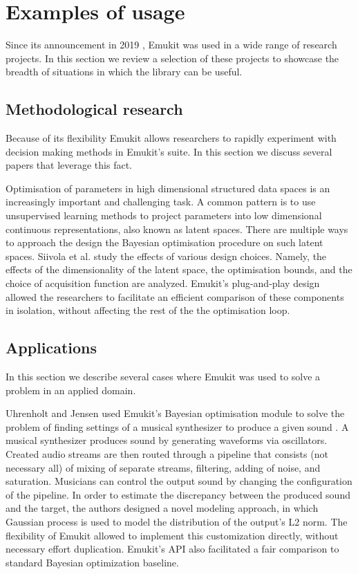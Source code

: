 
\section{Examples of usage}
Since its announcement in 2019 \cite{paleyes2019emulation}, Emukit was used in a wide range of research projects. In this section we review a selection of these projects to showcase the breadth of situations in which the library can be useful.

\subsection{Methodological research}
Because of its flexibility Emukit allows researchers to rapidly experiment with decision making methods in Emukit's suite. In this section we discuss several papers that leverage this fact.

Optimisation of parameters in high dimensional structured data spaces is an increasingly important and challenging task. A common pattern is to use unsupervised learning methods to project parameters into low dimensional continuous representations, also known as latent spaces. There are multiple ways to approach the design the Bayesian optimisation procedure on such latent spaces. Siivola et al. \cite{siivola2021good} study the effects of various design choices. Namely, the effects of the dimensionality of the latent space, the optimisation bounds, and the choice of acquisition function are analyzed. Emukit's plug-and-play design allowed the researchers to facilitate an efficient comparison of these components in isolation, without affecting the rest of the the optimisation loop.


\subsection{Applications}
In this section we describe several cases where Emukit was used to solve a problem in an applied domain.

Uhrenholt and Jensen used Emukit's Bayesian optimisation module to solve the problem of finding settings of a musical synthesizer to produce a given sound \cite{uhrenholt2019efficient}. A musical synthesizer produces sound by generating waveforms via oscillators. Created audio streams are then routed through a pipeline that consists (not necessary all) of mixing of separate streams, filtering, adding of noise, and saturation. Musicians can control the output sound by changing the configuration of the pipeline. In order to estimate the discrepancy between the produced sound and the target, the authors designed a novel modeling approach, in which Gaussian process is used to model the distribution of the output's L2 norm. The flexibility of Emukit allowed to implement this customization directly, without necessary effort duplication. Emukit's API also facilitated a fair comparison to standard Bayesian optimization baseline.

